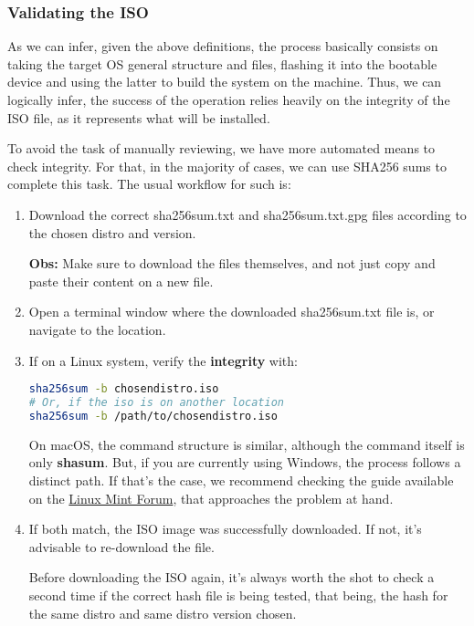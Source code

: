 \documentclass[a4paper,11pt]{article}
\begin{document}
\subsubsection{Validating the ISO}
As we can infer, given the above definitions, the process basically consists on
taking the target OS general structure and files, flashing it into the bootable
device and using the latter to build the system on the machine. Thus, we can
logically infer, the success of the operation relies heavily on the integrity of
the ISO file, as it represents what will be installed.\par
To avoid the task of manually reviewing, we have more automated means to check
integrity. For that, in the majority of cases, we can use SHA256 sums to
complete this task. The usual workflow for such is:
\begin{enumerate}
    \item Download the correct sha256sum.txt and sha256sum.txt.gpg files
        according to the chosen distro and version.\par
        \textbf{Obs:} Make sure to download the files themselves, and not just
        copy and paste their content on a new file.
    \item Open a terminal window where the downloaded sha256sum.txt file is, or
        navigate to the location.
    \item If on a Linux system, verify the \textbf{integrity} with:
\begin{lstlisting}[language=bash]
sha256sum -b chosendistro.iso
# Or, if the iso is on another location
sha256sum -b /path/to/chosendistro.iso
\end{lstlisting}
    \begin{remarkbox}
        On macOS, the command structure is similar, although the command itself
        is only \textbf{shasum}. But, if you are currently using Windows, the
        process follows a distinct path. If that's the case, we recommend
        checking the guide available on the
        \href{https://forums.linuxmint.com/viewtopic.php?f=42&t=291093}{Linux
        Mint Forum}, that approaches the problem at hand. 
    \end{remarkbox}
    \item If both match, the ISO image was successfully downloaded. If not, it's
        advisable to re-download the file.
        \begin{tipbox}
            Before downloading the ISO again, it's always worth the shot to
            check a second time if the correct hash file is being tested, that
            being, the hash for the same distro and same distro version chosen.
        \end{tipbox}
\end{enumerate}
\end{document}
